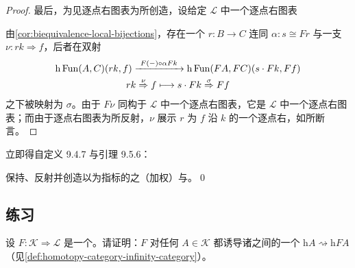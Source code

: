 \begin{proof}
最后，为见逐点右\trExtension{}图表为\trCosmologicalBiequivalence{}所创造，设给定 $\mathcal{L}$ 中一个逐点右\trExtension{}图表
\begin{center}
\end{center}
由\cref{cor:biequivalence-local-bijections}，存在一个\trFunctor{} $r\colon B\to C$ 连同\trIsomorphism{} $\alpha\colon s\cong Fr$ 与一支\trNaturalTransformation{} $\nu\colon rk\Rightarrow f$，后者在双射
\begin{equation*}
\begin{gathered}
\mathrm{h}\operatorname{Fun}(A,C)(rk,f)\xrightarrow{\ F(-)\circ\alpha Fk\ }\mathrm{h}\operatorname{Fun}(FA,FC)(s\cdot Fk,Ff)\\
rk\overset{\nu}{\Rightarrow}f\longmapsto s\cdot Fk\overset{\sigma}{\Rightarrow}Ff
\end{gathered}
\end{equation*}
之下被映射为 $\sigma$。由于 $F\nu$ 同构于 $\mathcal{L}$ 中一个逐点右\trExtension{}图表，它是 $\mathcal{L}$ 中一个逐点右\trExtension{}图表；而由于逐点右\trExtension{}图表为\trCosmologicalBiequivalence{}所反射，$\nu$ 展示 $r$ 为 $f$ 沿 $k$ 的一个逐点右\trExtension，如所断言。
\end{proof}

立即得自定义 9.4.7 与引理 9.5.6：
\begin{corollary}\label{cor:weighted-limits-biequivalence}
\trCosmologicalBiequivalence{}保持、反射并创造以\trInfinityCategory{}为指标的\trDiagram{}之（加权）\trLimit{}与\trColimit。\qed
\end{corollary}

\subsection*{练习}

\begin{exercise}\label{ex:homotopy-category-change-of-model}
设 $F\colon\mathcal{K}\Rightarrow\mathcal{L}$ 是一个\trCosmologicalBiequivalence。请证明：$F$ 对任何\trInfinityCategory{} $A\in\mathcal{K}$ 都诱导诸\trHomotopyCategory{}之间的一个\trEquivalence{} $\mathrm{h}A\rightsquigarrow\mathrm{h}FA$（见\cref{def:homotopy-category-infinity-category}）。
\end{exercise}

